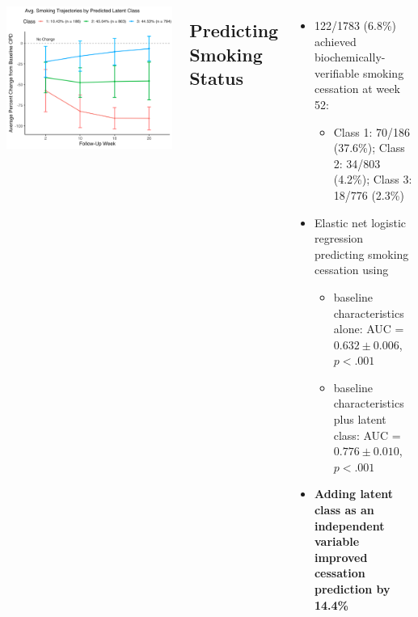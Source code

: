 \documentclass[
	25pt,
	a0paper, 
	portrait,
	blockverticalspace=-3em,
	margin=.5in,
	innermargin=0mm
]{tikzposter}
\begin{document}
{\begin{columns}
\begin{minipage}[]{0.5\linewidth}
\begin{tikzfigure}[]
						\centering
						\includegraphics[width=.9\linewidth]{smoking_traj}
					\end{tikzfigure}
					\subsection*{Predicting Smoking Status }
						\large
						\begin{itemize}
							\raggedright
								\item 122/1783 (6.8\%) achieved biochemically-verifiable smoking cessation at week 52:
								\begin{itemize}
										\item Class 1: 70/186 (37.6\%); Class 2: 34/803 (4.2\%); Class 3: 18/776 (2.3\%)
									\end{itemize}
								\item Elastic net logistic regression predicting smoking cessation using
								\begin{itemize}
										\item baseline characteristics alone: AUC = $0.632 \pm 0.006$, $p<.001$
										\item baseline characteristics plus latent class: AUC = $0.776 \pm 0.010$, $p<.001$
									\end{itemize}
								\item \textbf{Adding latent class as an independent variable improved cessation prediction by 14.4\%}
							\end{itemize}
						\centering
						\vspace{1mm}
			\end{minipage}
%				

		
	\end{columns}

}
\end{document}
